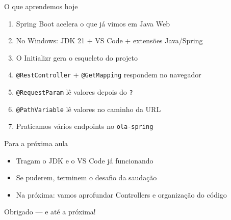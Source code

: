 \documentclass[aspectratio=169,11pt]{beamer}
\begin{document}
\begin{frame}{O que aprendemos hoje}
  \begin{enumerate}
    \item Spring Boot acelera o que já vimos em Java Web
    \item No Windows: JDK 21 + VS Code + extensões Java/Spring
    \item O Initializr gera o esqueleto do projeto
    \item \texttt{@RestController} + \texttt{@GetMapping} respondem no navegador
    \item \texttt{@RequestParam} lê valores depois do \texttt{?}
    \item \texttt{@PathVariable} lê valores no caminho da URL
    \item Praticamos vários endpoints no \texttt{ola-spring}
  \end{enumerate}
\end{frame}

\begin{frame}{Para a próxima aula}
  \begin{itemize}
    \item Tragam o JDK e o VS Code já funcionando
    \item Se puderem, terminem o desafio da saudação
    \item Na próxima: vamos aprofundar Controllers e organização do código
  \end{itemize}

  \vspace{1em}
  \begin{center}
    \Large Obrigado --- e até a próxima!
  \end{center}
\end{frame}
\end{document}
